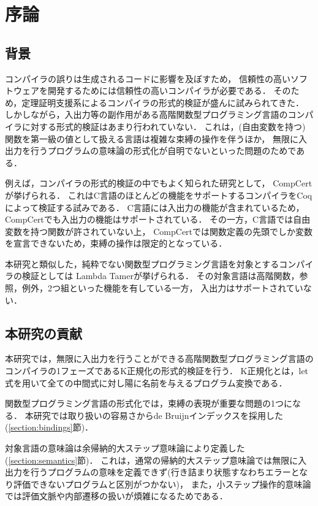 \documentclass{compsoft}
\begin{document}
\section{序論}
\subsection{背景}

コンパイラの誤りは生成されるコードに影響を及ぼすため，
信頼性の高いソフトウェアを開発するためには信頼性の高いコンパイラが必要である．
そのため，定理証明支援系によるコンパイラの形式的検証が盛んに試みられてきた．
しかしながら，入出力等の副作用がある高階関数型プログラミング言語のコンパイラに対する形式的検証はあまり行われていない．
これは，(自由変数を持つ)関数を第一級の値として扱える言語は複雑な束縛の操作を伴うほか，
無限に入出力を行うプログラムの意味論の形式化が自明でないといった問題のためである．

例えば，コンパイラの形式的検証の中でもよく知られた研究として，
CompCert\cite{2006-Leroy-Blazy-Dargaye}が挙げられる．
これはC言語のほとんどの機能をサポートするコンパイラをCoqによって検証する試みである．
C言語には入出力の機能が含まれているため，CompCertでも入出力の機能はサポートされている．
その一方，C言語では自由変数を持つ関数が許されていない上，
CompCertでは関数定義の先頭でしか変数を宣言できないため，束縛の操作は限定的となっている．

本研究と類似した，純粋でない関数型プログラミング言語を対象とするコンパイラの検証としては
Lambda Tamer\cite{ImpurePOPL10}が挙げられる．
その対象言語は高階関数，参照，例外，2つ組といった機能を有している一方，
入出力はサポートされていない．

\subsection{本研究の貢献}
本研究では，無限に入出力を行うことができる高階関数型プログラミング言語のコンパイラの1フェーズであるK正規化の形式的検証を行う．
K正規化とは，let式を用いて全ての中間式に対し陽に名前を与えるプログラム変換である．

関数型プログラミング言語の形式化では，束縛の表現が重要な問題の1つになる．
本研究では取り扱いの容易さからde Bruijnインデックスを採用した(\ref{section:bindings}節)．

対象言語の意味論は余帰納的大ステップ意味論により定義した(\ref{section:semantics}節)．
これは，通常の帰納的大ステップ意味論では無限に入出力を行うプログラムの意味を定義できず(行き詰まり状態すなわちエラーとなり評価できないプログラムと区別がつかない)，
また，小ステップ操作的意味論では評価文脈や内部遷移の扱いが煩雑になるためである．
\end{document}
